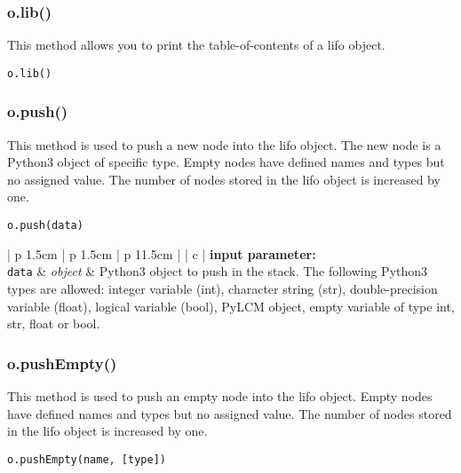 \vskip 0.8cm

\subsubsection{o.lib()}

This method allows you to print the table-of-contents of a {\sc lifo} object.

\begin{verbatim}
o.lib()
\end{verbatim}

\vskip 0.8cm

\subsubsection{o.push()}

This method is used to push a new node into the {\sc lifo} object. The new node is a Python3 object of specific type. Empty nodes have defined names and types but no assigned value.  The number of nodes stored in the {\sc lifo} object is increased by one.

\begin{verbatim}
o.push(data)
\end{verbatim}

\noindent
\begin{tabular} {| p {1.5cm} | p {1.5cm} | p {11.5cm} |}
\hline
{} {| c |} {\bf input parameter:} \\
\hline
{\tt data} & {\it object}  & Python3 object to push in the stack. The following Python3 types are allowed: integer variable (int), character string (str), double-precision variable (float),
logical variable (bool),  PyLCM object, empty variable of type int, str, float or bool.\\
\hline
\end{tabular}

\vskip 0.8cm

\subsubsection{o.pushEmpty()}

This method is used to push an empty node into the {\sc lifo} object. Empty nodes have defined names and types but no assigned value. The number of nodes stored in the {\sc lifo} object is increased by one.

\begin{verbatim}
o.pushEmpty(name, [type])
\end{verbatim}

